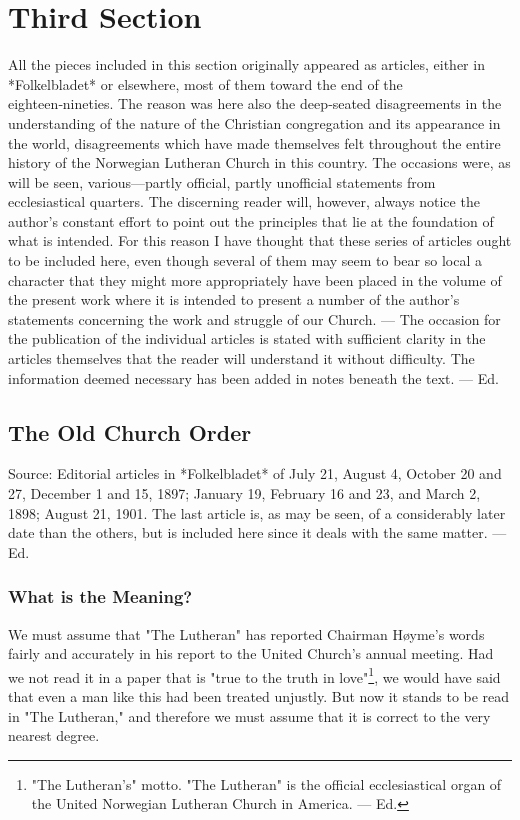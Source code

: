 
\section{Third Section}

All the pieces included in this section originally appeared as articles, either in *Folkelbladet* or elsewhere, most of them toward the end of the eighteen‑nineties. The reason was here also the deep‑seated disagreements in the understanding of the nature of the Christian congregation and its appearance in the world, disagreements which have made themselves felt throughout the entire history of the Norwegian Lutheran Church in this country. The occasions were, as will be seen, various—partly official, partly unofficial statements from ecclesiastical quarters. The discerning reader will, however, always notice the author’s constant effort to point out the principles that lie at the foundation of what is intended. For this reason I have thought that these series of articles ought to be included here, even though several of them may seem to bear so local a character that they might more appropriately have been placed in the volume of the present work where it is intended to present a number of the author’s statements concerning the work and struggle of our Church. — The occasion for the publication of the individual articles is stated with sufficient clarity in the articles themselves that the reader will understand it without difficulty. The information deemed necessary has been added in notes beneath the text. — Ed.

\subsection{The Old Church Order}

Source: Editorial articles in *Folkelbladet* of July 21, August 4, October 20 and 27, December 1 and 15, 1897; January 19, February 16 and 23, and March 2, 1898; August 21, 1901. The last article is, as may be seen, of a considerably later date than the others, but is included here since it deals with the same matter. — Ed.

\bigskip

\subsubsection{What is the Meaning?}

We must assume that "The Lutheran" has reported Chairman Høyme’s words fairly and accurately in his report to the United Church’s annual meeting. Had we not read it in a paper that is "true to the truth in love"\footnote{"The Lutheran’s" motto. "The Lutheran" is the official ecclesiastical organ of the United Norwegian Lutheran Church in America. — Ed.}, we would have said that even a man like this had been treated unjustly. But now it stands to be read in "The Lutheran," and therefore we must assume that it is correct to the very nearest degree.

